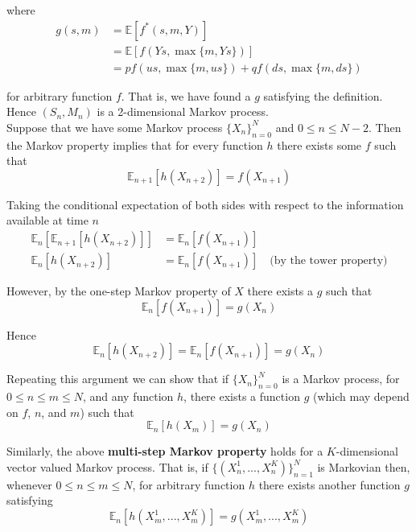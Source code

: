 \documentclass[12pt]{article}
\newlength\tindent
\renewcommand{\indent}{\hspace*{\tindent}}
\newcommand{\E}{\mathbb E}
\begin{document}
where
\begin{align*}
	g(s,m) &= \E [ f^*(s,m,Y) ] \\
	&= \E [ f(Ys, \max \{m, Ys \}) ] \\
	&= pf(us, \max \{m, us\}) + qf(ds, \max \{m, ds\})
\end{align*}

for arbitrary function $f$. That is, we have found a $g$ satisfying the definition. Hence $(S_n,M_n)$ is a 2-dimensional Markov process. \\

\indent Suppose that we have some Markov process $\{X_n\}^N_{n = 0}$ and $0 \leq n \leq N - 2$. Then the Markov property implies that for every function $h$ there exists some $f$ such that
\begin{equation*}
	\E_{n + 1}[h(X_{n + 2})] = f(X_{n + 1})
\end{equation*}

\indent Taking the conditional expectation of both sides with respect to the information available at time $n$ 
\begin{align*}
	\E_n \left[ \E_{n + 1}[h(X_{n + 2})] \right] &= \E_n \left[ f(X_{n + 1}) \right] \\
	\E_n [h(X_{n + 2})] &= \E_n[f(X_{n + 1})] \quad \text{(by the tower property)}
\end{align*}

However, by the one-step Markov property of $X$ there exists a $g$ such that
\begin{equation*}
	\E_n[f(X_{n + 1})] = g(X_n) 
\end{equation*}

Hence
\begin{equation*}
	\E_n[h(X_{n + 2})] = \E_n[f(X_{n + 1})] = g(X_n)
\end{equation*}

\indent Repeating this argument we can show that if $\{X_n\}^N_{n = 0}$ is a Markov process, for $0 \leq n \leq m \leq N$, and any function $h$, there exists a function $g$ (which may depend on $f$, $n$, and $m$) such that
\begin{equation*}
	\E_n[h(X_m)] = g(X_n)
\end{equation*}

\indent Similarly, the above {\bf multi-step Markov property} holds for a $K$-dimensional vector valued Markov process. That is, if $\{(X^1_n,...,X^K_n)\}_{n = 1}^N$ is Markovian then, whenever $0 \leq n \leq m \leq N$, for arbitrary function $h$ there exists another function $g$ satisfying
\begin{equation*}
	\E_n[h(X^1_m,...,X^K_m)] = g(X^1_m,...,X^K_m)
\end{equation*}
\end{document}
